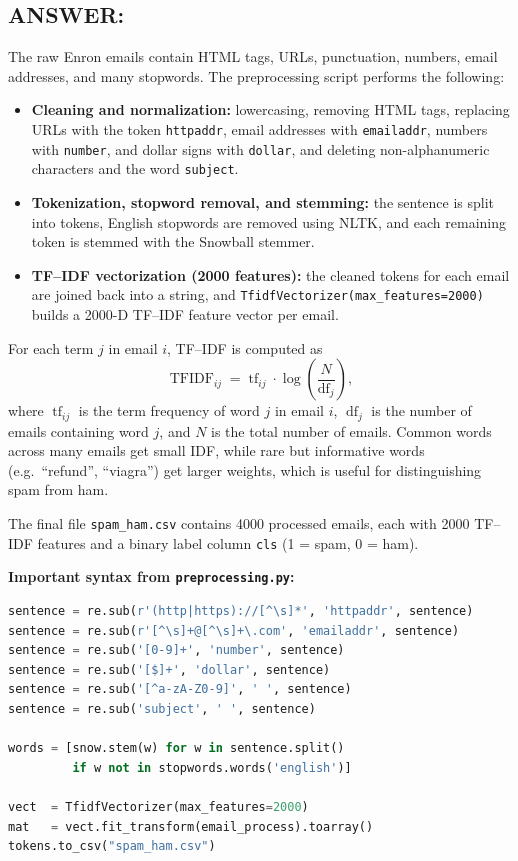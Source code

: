 \documentclass[12pt]{article}
\begin{document}
\subsection*{ANSWER:}
The raw Enron emails contain HTML tags, URLs, punctuation, numbers, email
addresses, and many stopwords. The preprocessing script performs the following:
\begin{itemize}
  \item \textbf{Cleaning and normalization:}
        lowercasing, removing HTML tags, replacing URLs with the token
        \texttt{httpaddr}, email addresses with \texttt{emailaddr},
        numbers with \texttt{number}, and dollar signs with \texttt{dollar},
        and deleting non-alphanumeric characters and the word \texttt{subject}.
  \item \textbf{Tokenization, stopword removal, and stemming:}
        the sentence is split into tokens, English stopwords are removed using
        NLTK, and each remaining token is stemmed with the Snowball stemmer.
  \item \textbf{TF--IDF vectorization (2000 features):}
        the cleaned tokens for each email are joined back into a string, and
        \texttt{TfidfVectorizer(max\_features=2000)} builds a 2000-D TF--IDF
        feature vector per email.
\end{itemize}

For each term $j$ in email $i$, TF--IDF is computed as
\[
\operatorname{TFIDF}_{ij}
=
\operatorname{tf}_{ij}
\cdot
\log\!\left(\frac{N}{\operatorname{df}_j}\right),
\]
where $\operatorname{tf}_{ij}$ is the term frequency of word $j$ in email $i$,
$\operatorname{df}_j$ is the number of emails containing word $j$, and $N$ is
the total number of emails. Common words across many emails get small IDF,
while rare but informative words (e.g.\ ``refund'', ``viagra'') get larger
weights, which is useful for distinguishing spam from ham.

The final file \texttt{spam\_ham.csv} contains 4000 processed emails, each with
2000 TF--IDF features and a binary label column \texttt{cls} (1 = spam, 0 = ham).

\textbf{Important syntax from \texttt{preprocessing.py}:}
\begin{lstlisting}[language=Python]
sentence = re.sub(r'(http|https)://[^\s]*', 'httpaddr', sentence)
sentence = re.sub(r'[^\s]+@[^\s]+\.com', 'emailaddr', sentence)
sentence = re.sub('[0-9]+', 'number', sentence)
sentence = re.sub('[$]+', 'dollar', sentence)
sentence = re.sub('[^a-zA-Z0-9]', ' ', sentence)
sentence = re.sub('subject', ' ', sentence)

words = [snow.stem(w) for w in sentence.split()
         if w not in stopwords.words('english')]

vect  = TfidfVectorizer(max_features=2000)
mat   = vect.fit_transform(email_process).toarray()
tokens.to_csv("spam_ham.csv")
\end{lstlisting}
\end{document}
